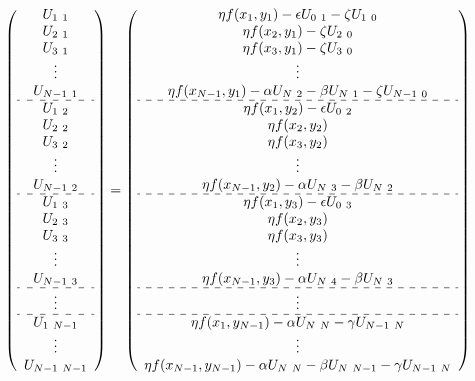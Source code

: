 \begin{eqnarray}
{\begin{array}{ccccc:ccccc:ccccc:c:ccc}
    \end{array}} \nonumber \\
    \pqty{\begin{array}{c}
        U_{1\ 1} \\
        U_{2\ 1} \\
        U_{3\ 1} \\
        \vdots \\
        U_{N-1\ 1} \\
        \hdashline
        U_{1\ 2} \\
        U_{2\ 2} \\
        U_{3\ 2} \\
        \vdots \\
        U_{N-1\ 2} \\
        \hdashline
        U_{1\ 3} \\
        U_{2\ 3} \\
        U_{3\ 3} \\
        \vdots \\
        U_{N-1\ 3} \\
        \hdashline
        \vdots \\
        \hdashline
        U_{1\ N-1} \\
        \vdots \\
        U_{N-1\ N-1}
    \end{array}}
    =\pqty{\begin{array}{c}
        \eta f(x_1,y_1)-\epsilon U_{0\ 1}-\zeta U_{1\ 0} \\
        \eta f(x_2,y_1)-\zeta U_{2\ 0} \\
        \eta f(x_3,y_1)-\zeta U_{3\ 0} \\
        \vdots \\
        \eta f(x_{N-1},y_1)-\alpha U_{N\ 2}-\beta U_{N\ 1}-\zeta U_{N-1\ 0} \\
        \hdashline
        \eta f(x_1,y_2)-\epsilon U_{0\ 2} \\
        \eta f(x_2,y_2) \\
        \eta f(x_3,y_2) \\
        \vdots \\
        \eta f(x_{N-1},y_2)-\alpha U_{N\ 3}-\beta U_{N\ 2} \\
        \hdashline
        \eta f(x_1,y_3)-\epsilon U_{0\ 3} \\
        \eta f(x_2,y_3) \\
        \eta f(x_3,y_3) \\
        \vdots \\
        \eta f(x_{N-1},y_3)-\alpha U_{N\ 4}-\beta U_{N\ 3} \\
        \hdashline
        \vdots \\
        \hdashline
        \eta f(x_1,y_{N-1})-\alpha U_{N\ N}-\gamma U_{N-1\ N} \\
        \vdots \\
        \eta f(x_{N-1},y_{N-1})-\alpha U_{N\ N}-\beta U_{N\ N-1}-\gamma U_{N-1\ N}
    \end{array}}
    \label{eq:numerical-partial-all}
    \setcounter{equation}{15}
\end{eqnarray}

